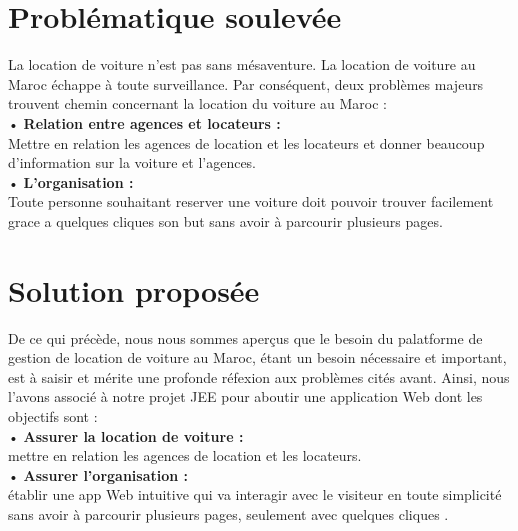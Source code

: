 \section{Problématique soulevée}
La location de voiture n'est pas sans mésaventure. La location de voiture au Maroc échappe à toute surveillance. 
Par conséquent, deux problèmes majeurs trouvent chemin concernant la location du voiture au Maroc :\\

• \textbf{Relation entre agences et locateurs :}\\

Mettre en relation les agences de location et les locateurs et donner beaucoup d'information sur la voiture et l'agences.\\

• \textbf{L'organisation :}\\

Toute personne souhaitant reserver une voiture doit pouvoir trouver facilement grace a quelques cliques son but sans avoir à parcourir plusieurs pages.\\

\section{Solution proposée}
De ce qui précède, nous nous sommes aperçus que le besoin du palatforme de gestion de location de voiture au Maroc, étant un besoin nécessaire et important, est à saisir et mérite une profonde réfexion aux problèmes cités avant. Ainsi, nous l'avons associé à notre projet JEE pour aboutir une application Web dont les objectifs sont :\\

• \textbf{Assurer la location de voiture :}\\

mettre en relation les agences de location et les locateurs.\\


• \textbf{Assurer l'organisation :}\\

établir une app Web intuitive qui va interagir avec le visiteur en toute simplicité sans avoir à parcourir plusieurs pages, seulement avec quelques cliques .\\

